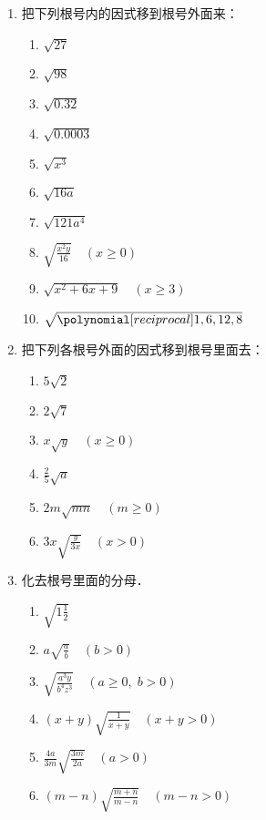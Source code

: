 \begin{ex}
\begin{enumerate}
    \item  把下列根号内的因式移到根号外面来：      
    \begin{multicols}{2}\begin{enumerate}
        \item $\sqrt{27}$
    \item $\sqrt{98}$
    \item $\sqrt{0.32}$
    \item $\sqrt{0.0003}$
    \item $\sqrt{x^3}$
    \item $\sqrt{16a}$
    \item $\sqrt{121a^4}$
    \item $\sqrt{\frac{x^2y}{16}}\quad (x\ge 0)$   
    \item $\sqrt{x^2+6x+9}\quad (x\ge 3)$
    \item $\sqrt{\poly{1,6,12,8}}$
\end{enumerate}    \end{multicols}
 
\item 把下列各根号外面的因式移到根号里面去：
\begin{multicols}{2}
    \begin{enumerate}
    \item $5\sqrt{2}$
    \item $2\sqrt{7}$
    \item $x\sqrt{y}\quad (x\ge 0)$
    \item $\frac{2}{5}\sqrt{a}$
    \item $2m\sqrt{mn}\quad (m\ge 0)$
    \item $3x\sqrt{\frac{y}{3x}}\quad (x>0)$
\end{enumerate}
\end{multicols}

\item 化去根号里面的分母．
\begin{enumerate}
    \item $\sqrt{1\frac{1}{2}}$
    \item $a\sqrt{\frac{a}{b}}\quad (b>0)$
    \item $\sqrt{\frac{a^3y}{b^4z^3}}\quad (a\ge 0,\; b>0)$
    \item $(x+y)\sqrt{\frac{1}{x+y}}\quad (x+y>0)$
    \item $\frac{4a}{3m}\sqrt{\frac{3m}{2a}}\quad (a>0)$
    \item $(m-n)\sqrt{\frac{m+n}{m-n}}\quad (m-n>0)$
\end{enumerate}
\end{enumerate}   
\end{ex}

